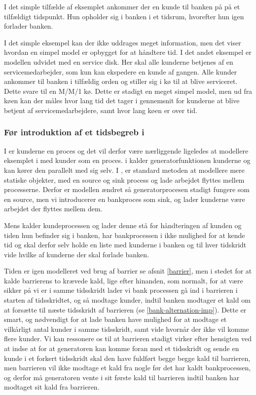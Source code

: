 I det simple tilfælde af eksemplet ankommer der en kunde til banken på på et 
tilfældigt tidspunkt. Hun opholder sig i banken i et tidsrum, hvorefter hun 
igen forlader banken.

I det simple eksempel kan der ikke uddrages meget information, men det viser hvordan en simpel model er opbygget for at håndtere tid.
I det andet eksempel er modellen 
udvidet med en service disk. Her skal alle kunderne betjenes af en 
servicemedarbejder, som kun kan ekspedere en kunde af gangen. Alle kunder ankommer til banken i tilfældig orden og 
stiller sig i kø til at blive serviceret. Dette  svare til en M/M/1 kø. Dette er stadigt en meget simpel model, men ud fra køen kan der måles hvor lang tid det tager i gennemsnit for kunderne at blive betjent af servicemedarbejdere, samt hvor lang køen er over tid. 

\subsubsection{Før introduktion af et tidsbegreb i \pycsp}
I \simpy er kunderne en proces og det vil derfor være nærliggende ligeledes at 
modellere eksemplet i \pycsp med kunder som en proces. i \simpy kalder 
generatorfunktionen kunderne og kan kører den parallelt med sig selv. 
I \pycsp{}, er standard metoden at modellere mere statiske objekter, med en source og sink 
process og lade arbejdet flyttes mellem processerne. Derfor er modellen ændret 
så  generatorprocesen stadigt fungere som en source, men vi introducerer en 
bankproces som sink, og lader kunderne være arbejdet der flyttes mellem dem. 

Mens \simpy  kalder kundeprocessen og lader denne stå for håndteringen af 
kunden og tiden hun befinder sig i banken, har bankprocessen i \pycsp ikke 
mulighed for at kende tid og skal derfor selv holde en liste med kunderne 
i banken og  til hver tidskridt vide hvilke af kunderne der skal forlade 
banken. 

Tiden er igen modelleret ved brug af barrier se afsnit \vref{barrier}, men 
i stedet for  at kalde barrierens to krævede kald, lige efter hinanden, som 
normalt, for at være sikker på vi er i samme tidsskridt lader vi bank
processen gå ind i barrieren i starten af tidsskridtet, og så modtage kunder, 
indtil banken modtager et kald om at forsætte til næste tidsskridt af 
barrieren (se \autoref{bank-alternation-imp}). Dette er smart, og nødvendigt for at lade banken have mulighed for at modtage 
et vilkårligt antal kunder i samme tidsskridt, samt vide hvornår der ikke vil  
komme flere kunder. Vi kan ressonere os til at barrieren stadigt virker efter 
hensigten ved at indse at for at generatoren kan komme foran med et tidsskridt og sende en 
kunde i et forkert tidsskridt skal den have fuldført begge begge kald til barrieren, men 
barrieren vil ikke modtage et kald fra nogle før det har kaldt bankprocessen, 
og derfor må generatoren vente i sit første kald til barrieren indtil banken har 
modtaget sit kald fra barrieren. 

